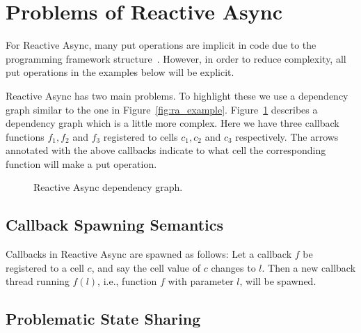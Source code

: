 \section{Problems of Reactive Async}%
\label{sec:problems_of_reactive_async}

For Reactive Async, many put operations are implicit in code due to the
programming framework structure~\parencite{conf/scala/HallerGES16}. However, in
order to reduce complexity, all put operations in the examples below will be
explicit.

Reactive Async has two main problems. To highlight these we use a 
dependency graph similar to the one in Figure~\ref{fig:ra_example}.
Figure~\ref{fig:ra_example2} describes a dependency graph which is a little more
complex. Here we have three callback functions $f_1, f_2$ and $f_3$ registered
to cells $c_1, c_2$ and $c_3$ respectively. The arrows annotated with the above
callbacks indicate to what cell the corresponding function will make a
put operation.

\begin{figure}
  \centering
  \caption{Reactive Async dependency graph.}
  \label{fig:ra_example2}
\end{figure}

\subsection{Callback Spawning Semantics}%
\label{sub:callback_spawning_semantics_ra}

Callbacks in Reactive Async are spawned as follows:  Let a callback $f$ be
registered to a cell $c$, and say the cell value of $c$ changes to $l$. Then a
new callback thread running $f(l)$, i.e., function $f$ with parameter $l$, will
be spawned.

\subsection{Problematic State Sharing}%
\label{sub:sharing_state}

